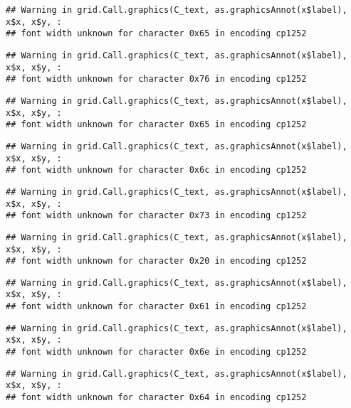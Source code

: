 \documentclass[
]{article}
\begin{document}
\begin{verbatim}
## Warning in grid.Call.graphics(C_text, as.graphicsAnnot(x$label), x$x, x$y, :
## font width unknown for character 0x65 in encoding cp1252
\end{verbatim}

\begin{verbatim}
## Warning in grid.Call.graphics(C_text, as.graphicsAnnot(x$label), x$x, x$y, :
## font width unknown for character 0x76 in encoding cp1252
\end{verbatim}

\begin{verbatim}
## Warning in grid.Call.graphics(C_text, as.graphicsAnnot(x$label), x$x, x$y, :
## font width unknown for character 0x65 in encoding cp1252
\end{verbatim}

\begin{verbatim}
## Warning in grid.Call.graphics(C_text, as.graphicsAnnot(x$label), x$x, x$y, :
## font width unknown for character 0x6c in encoding cp1252
\end{verbatim}

\begin{verbatim}
## Warning in grid.Call.graphics(C_text, as.graphicsAnnot(x$label), x$x, x$y, :
## font width unknown for character 0x73 in encoding cp1252
\end{verbatim}

\begin{verbatim}
## Warning in grid.Call.graphics(C_text, as.graphicsAnnot(x$label), x$x, x$y, :
## font width unknown for character 0x20 in encoding cp1252
\end{verbatim}

\begin{verbatim}
## Warning in grid.Call.graphics(C_text, as.graphicsAnnot(x$label), x$x, x$y, :
## font width unknown for character 0x61 in encoding cp1252
\end{verbatim}

\begin{verbatim}
## Warning in grid.Call.graphics(C_text, as.graphicsAnnot(x$label), x$x, x$y, :
## font width unknown for character 0x6e in encoding cp1252
\end{verbatim}

\begin{verbatim}
## Warning in grid.Call.graphics(C_text, as.graphicsAnnot(x$label), x$x, x$y, :
## font width unknown for character 0x64 in encoding cp1252
\end{verbatim}
\end{document}
